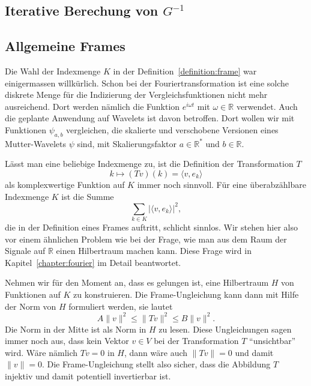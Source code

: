 \subsection{Iterative Berechung von $G^{-1}$
\label{subsection:graminverse}}

%
%
\subsection{Allgemeine Frames}
Die Wahl der Indexmenge $K$ in der Definition~\ref{definition:frame}
war einigermassen willkürlich.
Schon bei der Fouriertransformation ist eine solche diskrete Menge
für die Indizierung der Vergleichsfunktionen nicht mehr ausreichend.
Dort werden nämlich die Funktion $e^{i\omega t}$ mit $\omega\in\mathbb R$
verwendet.
Auch die geplante Anwendung auf Wavelets ist davon betroffen.
Dort wollen wir mit Funktionen $\psi_{a,b}$ vergleichen, die 
skalierte und verschobene Versionen eines Mutter-Wavelets $\psi$ sind,
mit Skalierungsfaktor $a\in\mathbb R^*$ und $b\in \mathbb R$.

Lässt man eine beliebige Indexmenge zu, ist die Definition der
Transformation $T$
\[
k
\mapsto
(Tv)(k) = \langle v,e_k\rangle
\]
als komplexwertige Funktion auf $K$ immer noch sinnvoll.
Für eine überabzählbare Indexmenge $K$ ist die Summe 
\[
\sum_{k\in K} |\langle v,e_k\rangle|^2,
\]
die in der Definition eines Frames auftritt, schlicht sinnlos.
Wir stehen hier also vor einem ähnlichen Problem wie bei der Frage,
wie man aus dem Raum der Signale auf $\mathbb R$ einen Hilbertraum machen kann.
Diese Frage wird in Kapitel~\ref{chapter:fourier} im Detail beantwortet.

Nehmen wir für den Moment an, dass es gelungen ist, eine Hilbertraum $H$
von Funktionen auf $K$ zu konstruieren.
Die Frame-Ungleichung kann dann mit Hilfe der Norm von $H$ formuliert
werden, sie lautet
\[
A\|v\|^2 \le \|Tv\|^2 \le B\|v\|^2.
\]
Die Norm in der Mitte ist als Norm in $H$ zu lesen.
Diese Ungleichungen sagen immer noch aus, dass kein Vektor $v\in V$ bei
der Transformation $T$ ``unsichtbar'' wird.
Wäre nämlich $Tv=0$ in $H$, dann wäre auch $\|Tv\|=0$ und damit
$\|v\|=0$.
Die Frame-Ungleichung stellt also sicher, dass die Abbildung $T$ 
injektiv und damit potentiell invertierbar ist.

